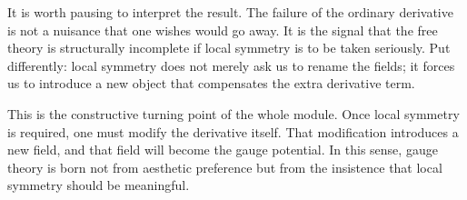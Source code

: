 \documentclass[11pt,a4paper]{article}
\begin{document}
It is worth pausing to interpret the result. The failure of the ordinary derivative is not a nuisance that one wishes would go away. It is the signal that the free theory is structurally incomplete if local symmetry is to be taken seriously. Put differently: local symmetry does not merely ask us to rename the fields; it forces us to introduce a new object that compensates the extra derivative term.

This is the constructive turning point of the whole module. Once local symmetry is required, one must modify the derivative itself. That modification introduces a new field, and that field will become the gauge potential. In this sense, gauge theory is born not from aesthetic preference but from the insistence that local symmetry should be meaningful.

\end{document}
